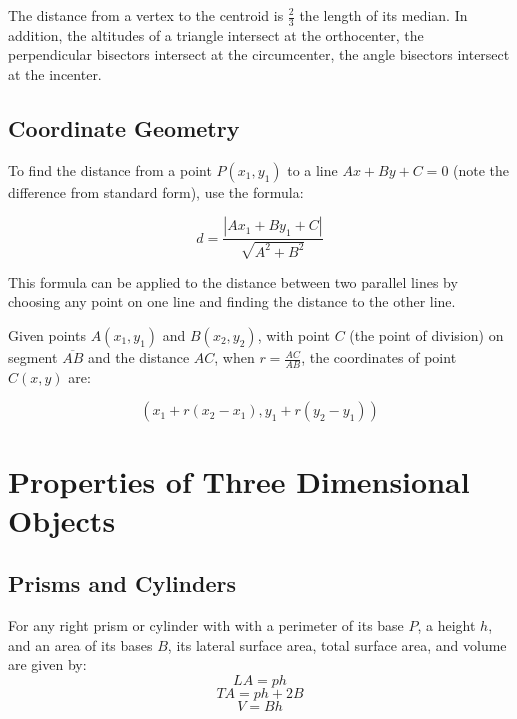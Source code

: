 \documentclass[final, letterpaper, 12pt]{article}
\begin{document}
		The distance from a vertex to the centroid is $\frac{2}{3}$ the length of its median.
		In addition, the altitudes of a triangle intersect at the orthocenter, the perpendicular bisectors intersect at the circumcenter, the angle bisectors intersect at the incenter.

	\subsection{Coordinate Geometry}\label{sec: ways of working with coordinates... in geometry}
		To find the distance from a point $P(x_1, y_1)$ to a line $Ax + By + C = 0$ (note the difference from standard form), use the formula:
		
		\begin{equation}
			d = \frac{|Ax_1 + By_1 + C|}{\sqrt{A^2 + B^2}}
		\end{equation}
		
		This formula can be applied to the distance between two parallel lines by choosing any point on one line and finding the distance to the other line.
		
		Given points $A(x_1,y_1)$ and $B(x_2,y_2)$, with point $C$ (the point of division) on segment $\overline{AB}$ and the distance $AC$, when $r = \frac{AC}{AB}$, the coordinates of point $C(x,y)$ are:
		
		\begin{equation}
			\left( x_1 + r (x_2 - x_1), y_1 + r (y_2 - y_1) \right)
		\end{equation}
		
\section{Properties of Three Dimensional Objects}
	\subsection{Prisms and Cylinders}\label{sec: simple formulae for the more simple objects}
		For any right prism or cylinder with with a perimeter of its base $P$, a height $h$, and an area of its bases $B$, its lateral surface area, total surface area, and volume are given by:
		\begin{equation}
			LA = ph
		\end{equation}
		\begin{equation}
			TA = ph+2B
		\end{equation}
		\begin{equation}
			V = Bh
		\end{equation}
\end{document}

